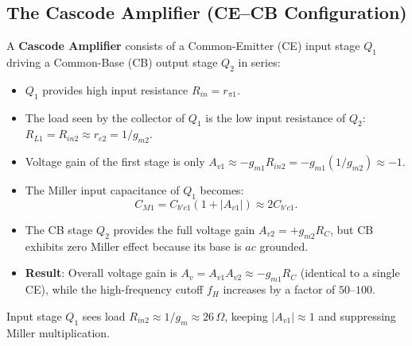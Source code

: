 \documentclass[12pt,a4paper]{article}
\begin{document}
\subsection{The Cascode Amplifier (CE--CB Configuration)}
\begin{tcolorbox}[defbox, title={Cascode Topology and Miller Effect Reduction}]
A \textbf{Cascode Amplifier} consists of a Common-Emitter (CE) input stage $Q_1$ driving a Common-Base (CB) output stage $Q_2$ in series:
\begin{itemize}[leftmargin=1.5em, itemsep=2pt]
  \item $Q_1$ provides high input resistance $R_{in} = r_{\pi 1}$.
  \item The load seen by the collector of $Q_1$ is the low input resistance of $Q_2$: $R_{L1} = R_{in2} \approx r_{e2} = 1/g_{m2}$.
  \item Voltage gain of the first stage is only $A_{v1} \approx -g_{m1} R_{in2} = -g_{m1}(1/g_{m2}) \approx -1$.
  \item The Miller input capacitance of $Q_1$ becomes:
  \[
  C_{M1} = C_{b'c1}(1 + |A_{v1}|) \approx 2 C_{b'c1}.
  \]
  \item The CB stage $Q_2$ provides the full voltage gain $A_{v2} = +g_{m2} R_C$, but CB exhibits zero Miller effect because its base is $ac$ grounded.
  \item \textbf{Result}: Overall voltage gain is $A_v = A_{v1} A_{v2} \approx -g_{m1} R_C$ (identical to a single CE), while the high-frequency cutoff $f_H$ increases by a factor of $50$--$100$.
\end{itemize}
\end{tcolorbox}

\begin{tcolorbox}[tikzbox, unbreakable, title={Cascode (CE--CB) Circuit Architecture}]
\centering
{}\par
\small Input stage $Q_1$ sees load $R_{in2} \approx 1/g_m \approx 26\,\Omega$, keeping $|A_{v1}| \approx 1$ and suppressing Miller multiplication.
\end{tcolorbox}
\end{document}
